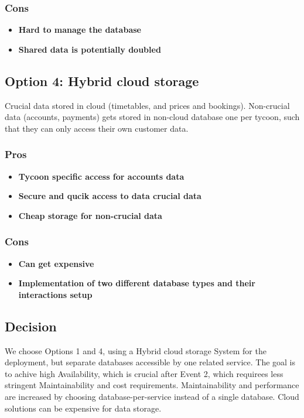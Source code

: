\subsubsection*{Cons}
\begin{itemize}[noitemsep]
    \item \textbf{Hard to manage the database} 
    \item \textbf{Shared data is potentially doubled} 
\end{itemize}

\subsection*{Option 4: Hybrid cloud storage}
Crucial data stored in cloud (timetables, and prices and bookings). Non-crucial data (accounts, payments) gets stored in non-cloud database one per tycoon, such that they can only access their own customer data.

\subsubsection*{Pros}
\begin{itemize}[noitemsep]
    \item \textbf{Tycoon specific access for accounts data} 
    \item \textbf{Secure and qucik access to data crucial data} 
    \item \textbf{Cheap storage for non-crucial data} 
\end{itemize}

\subsubsection*{Cons}
\begin{itemize}[noitemsep]
    \item \textbf{Can get expensive} 
    \item \textbf{Implementation of two different database types and their interactions setup}
\end{itemize}

\subsection*{Decision}
We choose Options 1 and 4, using a Hybrid cloud storage System for the deployment, but separate databases accessible by one related service.
The goal is to achive high Availability, which is crucial after Event 2, which requirees less stringent Maintainability and cost requirements. Maintainability and performance are increased by choosing database-per-service instead of a single database.
Cloud solutions can be expensive for data storage.

